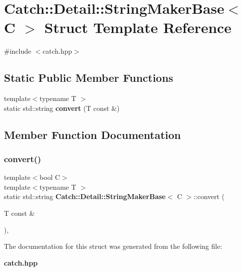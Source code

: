 \section{Catch\+:\+:Detail\+:\+:String\+Maker\+Base$<$ C $>$ Struct Template Reference}
\label{struct_catch_1_1_detail_1_1_string_maker_base}


{\ttfamily \#include $<$catch.\+hpp$>$}

\subsection*{Static Public Member Functions}
\begin{DoxyCompactItemize}
\item 
{\footnotesize template$<$typename T $>$ }\\static std\+::string \textbf{ convert} (T const \&)
\end{DoxyCompactItemize}


\subsection{Member Function Documentation}
\mbox{\label{struct_catch_1_1_detail_1_1_string_maker_base_a8eb9f635dc413a5758e22614bafaf1a3}} 
\subsubsection{convert()}
{\footnotesize\ttfamily template$<$bool C$>$ \\
template$<$typename T $>$ \\
static std\+::string \textbf{ Catch\+::\+Detail\+::\+String\+Maker\+Base}$<$ C $>$\+::convert (\begin{DoxyParamCaption}\item[{T const \&}]{ }\end{DoxyParamCaption})\hspace{0.3cm}{\ttfamily [inline]}, {\ttfamily [static]}}



The documentation for this struct was generated from the following file\+:\begin{DoxyCompactItemize}
\item 
\textbf{ catch.\+hpp}\end{DoxyCompactItemize}
